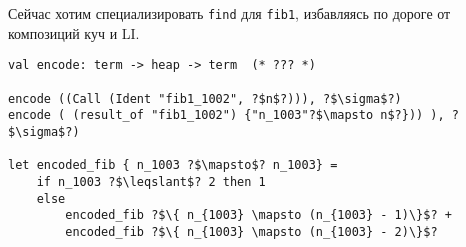 \documentclass{article}
\begin{document}
Сейчас хотим специализировать \texttt{find} для \texttt{fib1}, избавляясь по дороге от композиций куч и LI.

\begin{verbatim}
val encode: term -> heap -> term  (* ??? *)

encode ((Call (Ident "fib1_1002", ?$n$?))), ?$\sigma$?)
encode ( (result_of "fib1_1002") {"n_1003"?$\mapsto n$?})) ), ?$\sigma$?)

let encoded_fib { n_1003 ?$\mapsto$? n_1003} = 
    if n_1003 ?$\leqslant$? 2 then 1
    else 
        encoded_fib ?$\{ n_{1003} \mapsto (n_{1003} - 1)\}$? +  
        encoded_fib ?$\{ n_{1003} \mapsto (n_{1003} - 2)\}$?
\end{verbatim}


% 
% 
% 
\end{document}
